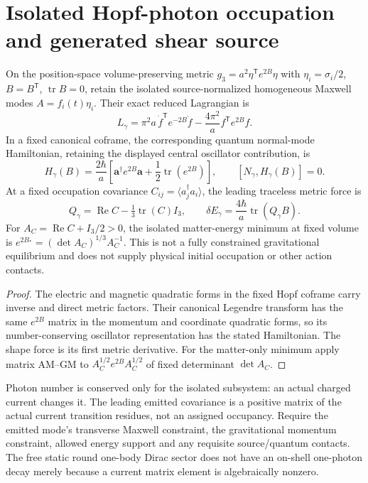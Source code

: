 \documentclass[12pt,a4paper]{article}
\begin{document}
\section{Isolated Hopf-photon occupation and generated shear source}
\label{bh:berger:v117:p5c:photon-shear}
\begin{proposition}
\label{bh:berger:v117:p5c:maxwell-triplet}
On the position-space volume-preserving metric
$g_3=a^2\eta^{\mathsf T}e^{2B}\eta$ with
$\eta_i=\sigma_i/2$, $B=B^{\mathsf T}$, $\operatorname{tr}B=0$,
retain the isolated source-normalized homogeneous Maxwell modes
$A=f_i(t)\eta_i$. Their exact reduced Lagrangian is
\[
 L_\gamma=\pi^2a\,\dot f^{\mathsf T}e^{-2B}\dot f
              -\frac{4\pi^2}{a}f^{\mathsf T}e^{2B}f.
\]
In a fixed canonical coframe, the corresponding quantum normal-mode
Hamiltonian, retaining the displayed central oscillator contribution, is
\[
 H_\gamma(B)=\frac{2\hbar}{a}
 \left[\mathbf a^\dagger e^{2B}\mathbf a
        +\frac12\operatorname{tr}(e^{2B})\right],
 \qquad [N_\gamma,H_\gamma(B)]=0.
\]
At a fixed occupation covariance $C_{ij}=\langle a_j^\dagger a_i\rangle$,
the leading traceless metric force is
\[
 Q_\gamma=\operatorname{Re}C-\tfrac13\operatorname{tr}(C)I_3,
 \qquad \delta E_\gamma=\frac{4\hbar}{a}
                       \operatorname{tr}(Q_\gamma B).
\]
For $A_C=\operatorname{Re}C+I_3/2>0$, the isolated matter-energy
minimum at fixed volume is
$e^{2B_*}=(\det A_C)^{1/3}A_C^{-1}$.
This is not a fully constrained gravitational equilibrium and does
not supply physical initial occupation or other action contacts.
\end{proposition}
\begin{proof}
The electric and magnetic quadratic forms in the fixed Hopf coframe
carry inverse and direct metric factors. Their canonical Legendre
transform has the same $e^{2B}$ matrix in the momentum and coordinate
quadratic forms, so its number-conserving oscillator representation
has the stated Hamiltonian. The shape force is its first metric
derivative. For the matter-only minimum apply matrix AM--GM to
$A_C^{1/2}e^{2B}A_C^{1/2}$ of fixed determinant $\det A_C$.
\end{proof}
\begin{remark}
\label{bh:berger:v117:p5c:production}
Photon number is conserved only for the isolated subsystem: an actual
charged current changes it. The leading emitted covariance is a
positive matrix of the actual current transition residues, not an
assigned occupancy. Require the emitted mode's transverse Maxwell
constraint, the gravitational momentum constraint, allowed energy
support and any requisite source/quantum contacts. The free static
round one-body Dirac sector does not have an on-shell one-photon decay
merely because a current matrix element is algebraically nonzero.
\end{remark}
\end{document}
